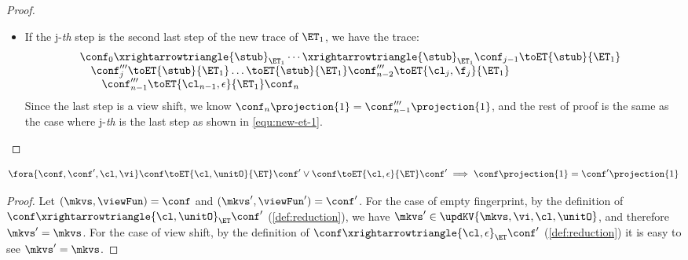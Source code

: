 \begin{proof}
\begin{itemize}
\begin{itemize}
\begin{itemize}
\[
\begin{array}{@{}l}
    \conf_0 \toET{\stub}{\ET_1 \cap \ET_2} \dots \toET{\stub}{\ET_1 \cap \ET_2} \conf''_{k-1} \toET{cl_{i}, \f_{i}}{\ET_1 \cap \ET_2} \\
    \quad \left( \conf_n\projection{1},\conf''_{k-1}\projection{2}\rmto{\cl_{i}}{\max\Set{\conf'_{i+1}\projection{2}(\cl_{i}), \conf_{n}\projection{2}(\cl_{i})} } \right)
\end{array}
\]
    \item If the j-\emph{th} step is the second last step of the new trace of \( \ET_1 \), we have the trace:
\begin{equation}
    \label{equ:new-et-1-with-view-shift-tail}
    \begin{array}{@{}l}
        \conf_0 \xrightarrowtriangle{\stub}_{\ET_{1}} \cdots \xrightarrowtriangle{\stub}_{\ET_{1}} \conf_{j-1} \toET{\stub}{\ET_{1}} \\ 
        \quad \conf'''_{j} \toET{\stub}{\ET_{1}} \dots \toET{\stub}{\ET_{1}} \conf'''_{n-2} \toET{\cl_j, \f_j }{\ET_{1}} \\
        \qquad \conf'''_{n-1} \toET{\cl_{n-1}, \epsilon }{\ET_{1}} \conf_{n}  \\ 
    \end{array}
\end{equation}
Since the last step is a view shift, we know \( \conf_n\projection{1} = \conf'''_{n-1}\projection{1}\), and the rest of proof is the same as the case where j-\emph{th} is the last step as shown in \cref{equ:new-et-1}.
\end{itemize}
\end{itemize}
\end{itemize}
\end{proof}

\begin{lemma}
    \label{lem:no-effect-for-empty-fingerprint}
    \label{lem:no-effect-for-view-shift}
    \[
    \fora{\conf, \conf', \cl,\vi} \conf \toET{\cl, \unitO}{\ET} \conf' \lor \conf \toET{\cl, \epsilon}{\ET} \conf' \implies \conf\projection{1} = \conf'\projection{1}
    \]
\end{lemma}
\begin{proof}
    Let \((\mkvs, \viewFun)  = \conf \) and \( (\mkvs', \viewFun') = \conf' \).
    For the case of empty fingerprint,
    by the definition of  $\conf \xrightarrowtriangle{\cl, \unitO}_{\ET} \conf'$ (\cref{def:reduction}), we have \(\mkvs' \in \updKV{\mkvs, \vi, \cl, \unitO}\), and therefore \( \mkvs' = \mkvs \).
    For the case of view shift, by the definition of  $\conf \xrightarrowtriangle{\cl, \epsilon}_{\ET} \conf'$ (\cref{def:reduction}) it is easy to see \( \mkvs' = \mkvs \).
\end{proof}

